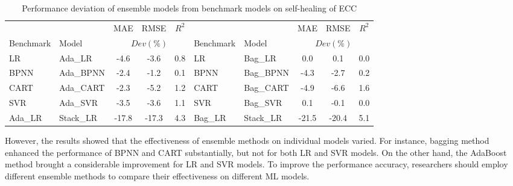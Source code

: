 \documentclass[11pt]{article}
\begin{document}
	
	\begin{table}[!h]
		\small
		\centering
		\caption{Performance deviation of ensemble models from benchmark models on self-healing of ECC }
		\begin{tabular*}{0.9\textwidth}{llccc|llccc}
			\toprule
			&	&	MAE	&	RMSE	&	$R^2$	&	&	&	MAE	&	RMSE	&	$R^2$	\\
			\cmidrule{3-5} \cmidrule{8-10}
			Benchmark & Model& \multicolumn{3}{c|}{$Dev (\%)$} &Benchmark & Model& \multicolumn{3}{c}{$Dev (\%)$} \\
			\midrule
			LR	&	Ada\_LR	&	-4.6	&	-3.6	&	0.8		&	LR	&	Bag\_LR	&	0.0	&	0.1	&	0.0	\\
			BPNN	&	Ada\_BPNN	&	-2.4	&	-1.2	&	0.1	&	BPNN	&	Bag\_BPNN	&	-4.3	&	-2.7	&	0.2	\\
			CART	&	Ada\_CART	&-2.3	&	-5.2	&	1.2	&	CART	&	Bag\_CART	&	-4.9	&	-6.6	&	1.6\\
			SVR	&	Ada\_SVR&-3.5	&	-3.6&	1.1	&	SVR	&	Bag\_SVR	&	0.1	&	-0.1	&	0.0	\\
			\midrule
			Ada\_LR	&	Stack\_LR	&	-17.8&	-17.3&	4.3	&	Bag\_LR	&	Stack\_LR	&-21.5	&	-20.4&	5.1 \\
			\bottomrule 
		\end{tabular*}
		\label{com}
	\end{table} 
	
		However, the results showed that the effectiveness of ensemble methods on individual models varied. For instance, bagging method enhanced the performance of BPNN and CART substantially, but not for both LR and SVR models. On the other hand, the AdaBoost method brought a considerable improvement for LR and SVR models. To improve the performance accuracy, researchers should employ different ensemble methods to compare their effectiveness on different ML models.  
	
\end{document}
